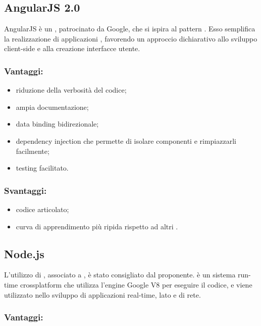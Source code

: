 \documentclass[a4paper, titlepage]{article}
\begin{document}
\subsection{AngularJS 2.0}
AngularJS è un   , patrocinato da Google, che si ispira al pattern .
Esso semplifica la realizzazione di applicazioni , favorendo un approccio dichiarativo allo sviluppo client-side e alla creazione interfacce utente.

\subsubsection{Vantaggi:}

\begin{itemize}
	\item riduzione della verbosità del codice;
	\item ampia documentazione;
	\item data binding bidirezionale;
	\item dependency injection che permette di isolare componenti e rimpiazzarli facilmente;
	\item testing facilitato.
\end{itemize}

\subsubsection{Svantaggi:}

\begin{itemize}
	\item codice articolato;
	\item curva di apprendimento più ripida rispetto ad altri .
\end{itemize}

\subsection{Node.js}
L'utilizzo di , associato a , è stato consigliato dal proponente.  è un sistema run-time crossplatform che utilizza l’engine Google V8  per eseguire il codice, e viene utilizzato nello sviluppo di applicazioni real-time, lato  e di rete.

\subsubsection{Vantaggi:}
\end{document}
